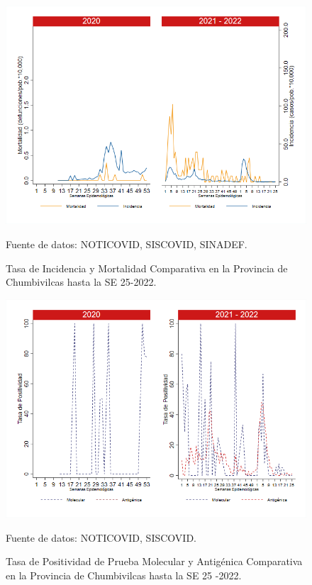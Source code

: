 \documentclass[12pt,a4paper,openany]{book}
\begin{document}
	\begin{figure}[h]
		\caption{Tasa de Incidencia y Mortalidad Comparativa en la Provincia de Chumbivilcas hasta la SE 25-2022.}\label{fig:inc_mort_chumbivilcas}
		\begin{center}
			\includegraphics[width=0.85\linewidth]{../figuras/incidencia_mortalidad_20_21_6.png}
		\end{center}
		{\footnotesize {Fuente de datos: NOTICOVID, SISCOVID, SINADEF.}}
	\end{figure}
	
	\begin{figure}[h]
		\caption{Tasa de Positividad de Prueba Molecular y Antigénica Comparativa en la Provincia de Chumbivilcas hasta la SE 25 -2022.}\label{fig:positividad_chumbivilcas}
		\begin{center}
			\includegraphics[width=0.7\linewidth]{../figuras/positividad_20_21_6.png}
		\end{center}
		{\footnotesize {Fuente de datos: NOTICOVID, SISCOVID.}}
	\end{figure}
	
\end{document}

